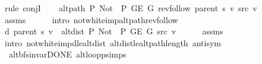 \begin{isabellebody}
\isamarkupfalse%
\ {\isacharparenleft}{\kern0pt}rule\ conjI{\isacharparenright}{\kern0pt}\isanewline
\ \ \isamarkupfalse%
\ {\isachardoublequoteopen}alt{\isacharunderscore}{\kern0pt}path\ P{\isacharprime}{\kern0pt}{\isacharprime}{\kern0pt}\ {\isacharparenleft}{\kern0pt}Not\ {\isasymcirc}\ P{\isacharprime}{\kern0pt}{\isacharprime}{\kern0pt}{\isacharparenright}{\kern0pt}\ {\isacharparenleft}{\kern0pt}G{\isachardot}{\kern0pt}E\ G{\isacharparenright}{\kern0pt}\ {\isacharparenleft}{\kern0pt}rev{\isacharunderscore}{\kern0pt}follow\ {\isacharparenleft}{\kern0pt}parent\ s{\isacharparenright}{\kern0pt}\ v{\isacharparenright}{\kern0pt}\ src\ v{\isachardoublequoteclose}\isanewline
\ \ \ \ \isamarkupfalse%
\ assms\isanewline
\ \ \ \ \isamarkupfalse%
\ {\isacharparenleft}{\kern0pt}intro\ not{\isacharunderscore}{\kern0pt}white{\isacharunderscore}{\kern0pt}imp{\isacharunderscore}{\kern0pt}alt{\isacharunderscore}{\kern0pt}path{\isacharunderscore}{\kern0pt}rev{\isacharunderscore}{\kern0pt}follow{\isacharparenright}{\kern0pt}\isanewline
\ \ \isamarkupfalse%
\ {\isachardoublequoteopen}d\ {\isacharparenleft}{\kern0pt}parent\ s{\isacharparenright}{\kern0pt}\ v\ {\isacharequal}{\kern0pt}\ alt{\isacharunderscore}{\kern0pt}dist\ P{\isacharprime}{\kern0pt}{\isacharprime}{\kern0pt}\ {\isacharparenleft}{\kern0pt}Not\ {\isasymcirc}\ P{\isacharprime}{\kern0pt}{\isacharprime}{\kern0pt}{\isacharparenright}{\kern0pt}\ {\isacharparenleft}{\kern0pt}G{\isachardot}{\kern0pt}E\ G{\isacharparenright}{\kern0pt}\ src\ v{\isachardoublequoteclose}\isanewline
\ \ \ \ \isamarkupfalse%
\ assms\isanewline
\ \ \ \ \isamarkupfalse%
\ {\isacharparenleft}{\kern0pt}intro\ not{\isacharunderscore}{\kern0pt}white{\isacharunderscore}{\kern0pt}imp{\isacharunderscore}{\kern0pt}d{\isacharunderscore}{\kern0pt}le{\isacharunderscore}{\kern0pt}alt{\isacharunderscore}{\kern0pt}dist\ alt{\isacharunderscore}{\kern0pt}dist{\isacharunderscore}{\kern0pt}le{\isacharunderscore}{\kern0pt}alt{\isacharunderscore}{\kern0pt}path{\isacharunderscore}{\kern0pt}length\ antisym{\isacharparenright}{\kern0pt}\isanewline
{}\isamarkupfalse%
%
\endisatagproof
{\isafoldproof}%
%
\isadelimproof
\isanewline
%
\endisadelimproof
%
\isadeliminvisible
\isanewline
%
\endisadeliminvisible
%
\isataginvisible
{}\isamarkupfalse%
\ {\isacharparenleft}{\kern0pt}\ alt{\isacharunderscore}{\kern0pt}bfs{\isacharunderscore}{\kern0pt}invar{\isacharunderscore}{\kern0pt}DONE{\isacharparenright}{\kern0pt}\ alt{\isacharunderscore}{\kern0pt}loop{\isacharunderscore}{\kern0pt}psimps{\isacharcolon}{\kern0pt}\isanewline

\end{isabellebody}
